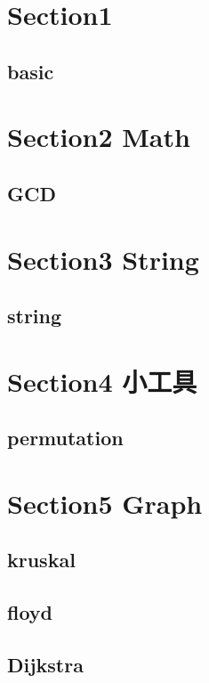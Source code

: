 \section{Section1}
    \subsection{basic}
        
        
\section{Section2 Math}
    \subsection{GCD}
            

\section{Section3 String}
    \subsection{string}
        

\section{Section4 小工具}
    \subsection{permutation}
        

\section{Section5 Graph}
    \subsection{kruskal}
        
    \subsection{floyd}
        
    \subsection{Dijkstra}
        

